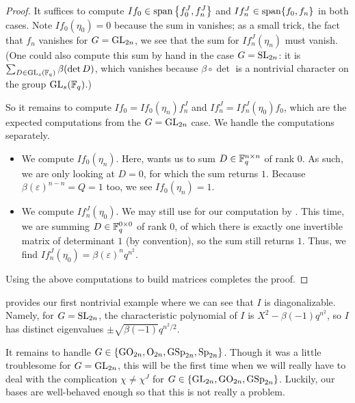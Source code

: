 \begin{proof}
	It suffices to compute $If_0\in\operatorname{span}\left\{f_0^J,f_n^J\right\}$ and $If_n^J\in\operatorname{span}\{f_0,f_n\}$ in both cases. Note $If_0(\eta_0)=0$ because the sum in  vanishes; as a small trick, the fact that $f_n$ vanishes for $G=\mathrm{GL}_{2n}$, we see that the sum for $If_n^J(\eta_n)$ must vanish. (One could also compute this sum by hand in the case $G=\mathrm{SL}_{2n}$: it is $\sum_{D\in\operatorname{GL}_s(\mathbb F_q)}\beta(\det D)$, which vanishes because $\beta\circ\det$ is a nontrivial character on the group $\mathrm{GL}_s(\mathbb F_q)$.)

	So it remains to compute $If_0=If_0(\eta_n)f_n^J$ and $If_n^J=If_n^J(\eta_0)f_0$, which are the expected computations from the $G=\mathrm{GL}_{2n}$ case. We handle the computations separately.
	\begin{itemize}
		\item We compute $If_0(\eta_n)$. Here,  wants us to sum $D\in\mathbb F_q^{n\times n}$ of rank $0$. As such, we are only looking at $D=0$, for which the sum returns $1$. Because $\beta(\varepsilon)^{n-n}=Q=1$ too, we see $If_0(\eta_n)=1$.
		\item We compute $If_n^J(\eta_0)$. We may still use  for our computation by . This time, we are summing $D\in\mathbb F_q^{0\times0}$ of rank $0$, of which there is exactly one invertible matrix of determinant $1$ (by convention), so the sum still returns $1$. Thus, we find $If_n^J(\eta_0)=\beta(\varepsilon)^nq^{n^2}$.
	\end{itemize}
	Using the above computations to build matrices completes the proof.
\end{proof}
\begin{remark}
	 provides our first nontrivial example where we can see that $I$ is diagonalizable. Namely, for $G=\mathrm{SL}_{2n}$, the characteristic polynomial of $I$ is $X^2-\beta(-1)q^{n^2}$, so $I$ has distinct eigenvalues $\pm\sqrt{\beta(-1)}q^{n^2/2}$.
\end{remark}
It remains to handle $G\in\{\mathrm{GO}_{2n},\mathrm{O}_{2n},\mathrm{GSp}_{2n},\mathrm{Sp}_{2n}\}$. Though it was a little troublesome for $G=\mathrm{GL}_{2n}$, this will be the first time when we will really have to deal with the complication $\chi\ne\chi^J$ for $G\in\{\mathrm{GL}_{2n},\mathrm{GO}_{2n},\mathrm{GSp}_{2n}\}$. Luckily, our bases are well-behaved enough so that this is not really a problem.
